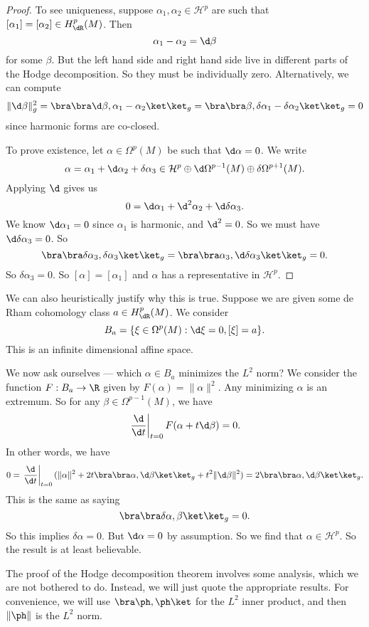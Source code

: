 \documentclass[a4paper]{article}
\begin{document}
\begin{proof}
  To see uniqueness, suppose $\alpha_1, \alpha_2 \in \mathcal{H}^p$ are such that $[\alpha_1] = [\alpha_2] \in H_{\dR}^p(M)$. Then
  \[
    \alpha_1 - \alpha_2 = \d \beta
  \]
  for some $\beta$. But the left hand side and right hand side live in different parts of the Hodge decomposition. So they must be individually zero. Alternatively, we can compute
  \[
    \|\d \beta\|_g^2 = \bra\bra \d \beta, \alpha_1- \alpha_2\ket\ket_g = \bra \bra \beta, \delta \alpha_1 - \delta \alpha_2\ket\ket_g = 0
  \]
  since harmonic forms are co-closed.

  To prove existence, let $\alpha \in \Omega^p(M)$ be such that $\d \alpha = 0$. We write
  \[
    \alpha = \alpha_1 + \d \alpha_2 + \delta\alpha_3 \in \mathcal{H}^p \oplus \d \Omega^{p - 1}(M) \oplus \delta \Omega^{p + 1}(M).
  \]
  Applying $\d$ gives us
  \[
    0 = \d \alpha_1 + \d^2 \alpha_2 + \d \delta \alpha_3.
  \]
  We know $\d \alpha_1 = 0$ since $\alpha_1$ is harmonic, and $\d^2 = 0$. So we must have $\d \delta \alpha_3 = 0$. So
  \[
    \bra \bra \delta \alpha_3, \delta \alpha_3\ket\ket_g = \bra \bra \alpha_3, \d \delta \alpha_3\ket\ket_g = 0.
  \]
  So $\delta \alpha_3 = 0$. So $[\alpha] = [\alpha_1]$ and $\alpha$ has a representative in $\mathcal{H}^p$.
\end{proof}
We can also heuristically justify why this is true. Suppose we are given some de Rham cohomology class $a \in H_{\dR}^p(M)$. We consider
\[
  B_a = \{\xi \in \Omega^p(M): \d \xi = 0, [\xi] = a\}.
\]
This is an infinite dimensional affine space.

We now ask ourselves --- which $\alpha \in B_a$ minimizes the $L^2$ norm? We consider the function $F: B_a \to \R$ given by $F(\alpha) = \|\alpha\|^2$. Any minimizing $\alpha$ is an extremum. So for any $\beta \in \Omega^{p - 1}(M)$, we have
\[
  \left.\frac{\d}{\d t}\right|_{t = 0} F(\alpha + t \d \beta) = 0.
\]
In other words, we have
\[
  0 = \left.\frac{\d}{\d t}\right|_{t = 0} (\|\alpha\|^2 + 2t \bra \bra \alpha, \d \beta\ket\ket_g + t^2 \|\d \beta\|^2) = 2 \bra\bra \alpha, \d \beta\ket\ket_g.
\]
This is the same as saying
\[
  \bra \bra \delta \alpha, \beta\ket\ket_g = 0.
\]
So this implies $\delta \alpha = 0$. But $\d \alpha = 0$ by assumption. So we find that $\alpha \in \mathcal{H}^p$. So the result is at least believable.

The proof of the Hodge decomposition theorem involves some analysis, which we are not bothered to do. Instead, we will just quote the appropriate results. For convenience, we will use $\bra \ph, \ph\ket$ for the $L^2$ inner product, and then $\|\ph\|$ is the $L^2$ norm.
\end{document}
